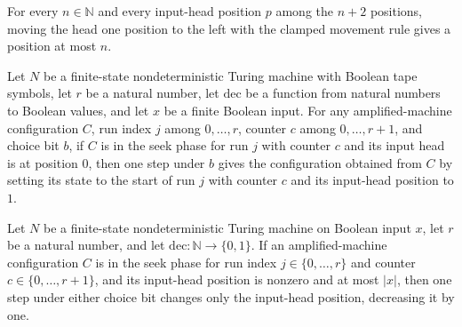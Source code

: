 \begin{theorem}
\label{Randomized.Amplify.moveInputPos_neg_one_le}
\leanok
{}
For every $n\in\mathbb{N}$ and every input-head position $p$ among the $n+2$ positions,
moving the head one position to the left with the clamped movement rule gives a position
at most $n$.
\end{theorem}

\begin{theorem}
\label{Randomized.Amplify.step_seek_zero}
\leanok
{}
Let $N$ be a finite-state nondeterministic Turing machine with Boolean tape symbols, let
$r$ be a natural number, let $\mathrm{dec}$ be a function from natural numbers to
Boolean values, and let $x$ be a finite Boolean input. For any amplified-machine
configuration $C$, run index $j$ among $0,\ldots,r$, counter $c$ among $0,\ldots,r+1$,
and choice bit $b$, if $C$ is in the seek phase for run $j$ with counter $c$ and its
input head is at position $0$, then one step under $b$ gives the configuration obtained
from $C$ by setting its state to the start of run $j$ with counter $c$ and its
input-head position to $1$.
\end{theorem}

\begin{theorem}
\label{Randomized.Amplify.step_seek_pos}
\leanok
{}
Let $N$ be a finite-state nondeterministic Turing machine on Boolean input $x$, let $r$
be a natural number, and let $\mathrm{dec}:\mathbb{N}\to\{0,1\}$. If an
amplified-machine configuration $C$ is in the seek phase for run index
$j\in\{0,\ldots,r\}$ and counter $c\in\{0,\ldots,r+1\}$, and its input-head position is
nonzero and at most $|x|$, then one step under either choice bit changes only the
input-head position, decreasing it by one.
\end{theorem}

